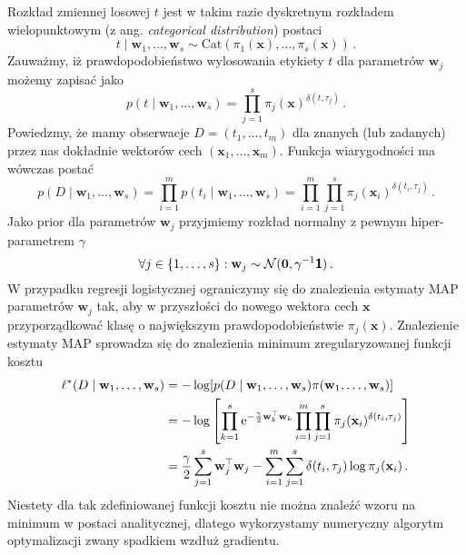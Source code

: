 \documentclass{myclass}
\begin{document}
Rozkład zmiennej losowej \(t\) jest  w takim razie dyskretnym rozkładem wielopunktowym (z ang.
\textit{categorical distribution}) postaci
\begin{equation*}
    t \mid \mathbf{w}_1,\ldots,\mathbf{w}_s \sim \text{Cat}(\pi_1(\mathbf{x}),\ldots,\pi_s(\mathbf{x}))\,.
\end{equation*}
Zauważmy, iż prawdopodobieństwo wylosowania etykiety \(t\) dla parametrów \(\mathbf{w}_j\) możemy
zapisać jako
\begin{equation*}
    p(t \mid \mathbf{w}_1,\ldots,\mathbf{w}_s) = \prod_{j=1}^s \pi_j(\mathbf{x})^{\delta(t,\tau_j)}\,.
\end{equation*}
Powiedzmy, że mamy obserwacje \(D = (t_1,\ldots,t_m)\) dla znanych (lub zadanych) przez nas
dokładnie wektorów cech \((\mathbf{x}_1, \ldots, \mathbf{x}_m)\). Funkcja wiarygodności ma wówczas
postać
\begin{equation*}
    p(D \mid \mathbf{w}_1,\ldots,\mathbf{w}_s) = \prod_{i=1}^m p(t_i \mid \mathbf{w}_1,\ldots,\mathbf{w}_s) = \prod_{i=1}^m \prod_{j=1}^s \pi_j(\mathbf{x}_i)^{\delta(t_i,\tau_j)}\,.
\end{equation*}
Jako prior dla parametrów \(\mathbf{w}_j\) przyjmiemy rozkład normalny z pewnym hiper-parametrem
\(\gamma\)
\begin{equation*}
    \forall j\in \{1,\ldots,s\} : \mathbf{w}_j \sim \mathcal{N}(\mathbf{0}, \gamma^{-1}\boldsymbol{\mathsf{1}})\,.
\end{equation*}
W przypadku regresji logistycznej ograniczymy się do znalezienia estymaty MAP parametrów
\(\mathbf{w}_j\) tak, aby w przyszłości do nowego wektora cech \(\mathbf{x}\) przyporządkować klasę
o największym prawdopodobieństwie \(\pi_j(\mathbf{x})\). Znalezienie estymaty MAP sprowadza się do
znalezienia minimum zregularyzowanej funkcji kosztu
\begin{equation*}
    \begin{split}
        \ell^*(D \mid \mathbf{w}_1,\ldots,\mathbf{w}_s) &= -\log [p(D \mid \mathbf{w}_1,\ldots,\mathbf{w}_s ) \pi(\mathbf{w}_1, \ldots, \mathbf{w}_s)] \\
        &= - \log \left[\prod_{k=1}^s\mathrm{e}^{-\frac{\gamma}{2}\mathbf{w}_k^\top\mathbf{w}_k}\prod_{i=1}^m \prod_{j=1}^s \pi_j(\mathbf{x}_i)^{\delta(t_i,\tau_j)}\right]\\
        &= \frac{\gamma}{2}\sum_{j=1}^s \mathbf{w}_j^\top\mathbf{w}_j - \sum_{i=1}^m\sum_{j=1}^s \delta(t_i,\tau_j)\log\pi_j(\mathbf{x}_i)\,.
    \end{split}
\end{equation*}
Niestety dla tak zdefiniowanej funkcji kosztu nie można znaleźć wzoru na minimum w postaci
analitycznej, dlatego wykorzystamy numeryczny algorytm optymalizacji zwany spadkiem wzdłuż
gradientu.
\end{document}
